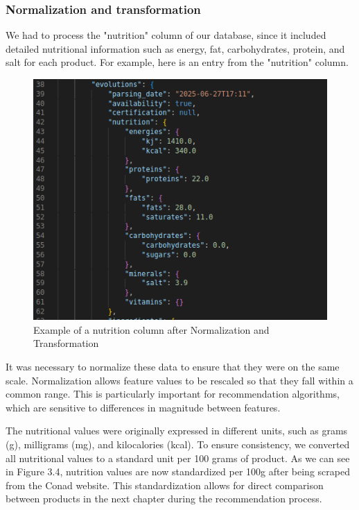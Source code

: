 \subsubsection{Normalization and transformation}

We had to process the "nutrition" column of our database, since it included detailed nutritional information such as energy, fat, carbohydrates,
protein, and salt for each product. For example, here is an entry from
the "nutrition" column.

\begin{center}
\begin{figure}[H]
    \centering
    \includegraphics[scale=0.33]{images/transform_nutrition.png}
    \caption{Example of a nutrition column after Normalization and Transformation} 
    \label{fig:Normalization_nutrition}
\end{figure}
\end{center}

\par It was necessary to normalize these data to ensure that they were on
the same scale. Normalization allows feature values to be rescaled so
that they fall within a common range. This is particularly important
for recommendation algorithms, which are sensitive to differences in
magnitude between features.

\par The nutritional values were originally expressed in different units, such as
grams (g), milligrams (mg), and kilocalories (kcal). To ensure consistency,
we converted all nutritional values to a standard unit per 100 grams
of product. As we can see in Figure 3.4, nutrition values are now
standardized per 100g after being scraped from the Conad website. This
standardization allows for direct comparison between products in the
next chapter during the recommendation process.

